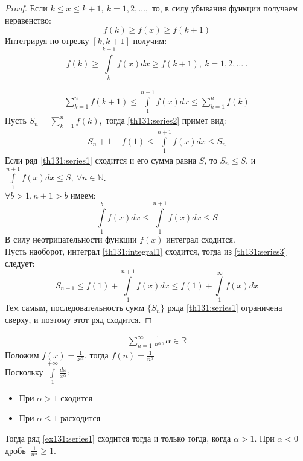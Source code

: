 \begin{proof}
  Если $k \leq x \leq k + 1, \ k = 1, 2, \dots,$ то, в силу убывания функции
  получаем неравенство:
  $$f(k) \geq f(x) \geq f(k + 1)$$
  Интегрируя по отрезку $[k, k + 1]$ получим:
  $$f(k) \geq \int\limits_k^{k+1} f(x) dx \geq f(k+1), \ k = 1, 2, \dots \ .$$

  \begin{gather}
    \label{th131:series2}
    \sum\limits_{k = 1}^{n} f(k+1) \leq \int\limits_1^{n+1} f(x) dx \leq
    \sum\limits_{k = 1}^{n} f(k)
  \end{gather}
  Пусть $S_n = \sum\limits_{k = 1}^{n} f(k),$ тогда \ref{th131:series2} примет вид:
  \begin{gather}
    \label{th131:series3}
    S_n + 1 - f(1) \leq \int\limits_1^{n+1} f(x) dx \leq S_n
  \end{gather}
  Если ряд \ref{th131:series1} сходится и его сумма равна $S$, то $S_n \leq S$,
  и $\int\limits_1^{n+1} f(x) dx \leq S, \ \forall n \in \mathbb{N}$. \\
  $\forall b > 1, n + 1 > b$ имеем:
  $$\int\limits_1^b f(x) dx \leq \int\limits_1^{n+1} f(x) dx \leq S$$
  В силу неотрицательности функции $f(x)$ интеграл сходится. \\
  Пусть наоборот, интеграл \ref{th131:integral1} сходится, тогда из
  \ref{th131:series3} следует:
  $$S_{n+1} \leq f(1) + \int\limits_1^{n+1} f(x) dx
  \leq f(1) + \int\limits_1^\infty f(x) dx$$
  Тем самым, последовательность сумм $\{S_n\}$ ряда \ref{th131:series1}
  ограничена сверху, и поэтому этот ряд сходится.
\end{proof}

\begin{example}
  \label{th131:example131}
  \begin{gather}
    \label{ex131:series1}
    \sum\limits_{n = 1}^{\infty} \frac{1}{n^\alpha}, \alpha \in \mathbb{R}
  \end{gather}
  Положим $f(x) = \frac{1}{x^\alpha}$, тогда $f(n) = \frac{1}{n^\alpha}$ \\
  Поскольку $\int\limits_1^{+\infty} \frac{dx}{x^\alpha}$:
  \begin{itemize}
    \item При $\alpha > 1$ сходится
    \item При $\alpha \leq 1$ расходится
  \end{itemize}
  Тогда ряд \ref{ex131:series1} сходится тогда и только тогда, когда $\alpha > 1$.
  При $\alpha < 0 \ $ дробь $ \ \frac{1}{n^\alpha} \geq 1$.
\end{example}

